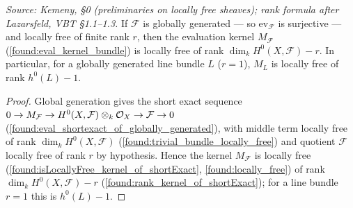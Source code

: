 \begin{lemma}
  \label{found:eval_kernel_locally_free}
  \textit{Source: Kemeny, \S0 (preliminaries on locally free sheaves); rank formula after Lazarsfeld, VBT \S1.1--1.3.}
  If \(\mathcal F\) is globally generated --- so \(\mathrm{ev}_{\mathcal F}\) is
  surjective --- and locally free of finite rank \(r\), then the evaluation kernel
  \(M_{\mathcal F}\) (\cref{found:eval_kernel_bundle}) is locally free of rank
  \(\dim_k H^0(X,\mathcal F)-r\).  In particular, for a globally generated line bundle
  \(L\) (\(r=1\)), \(M_L\) is locally free of rank \(h^0(L)-1\).
\end{lemma}

\begin{proof}
  Global generation gives the short exact sequence
  \(0\to M_{\mathcal F}\to H^0(X,\mathcal F)\otimes_k\mathcal{O}_X\to\mathcal F\to 0\)
  (\cref{found:eval_shortexact_of_globally_generated}), with middle term locally free
  of rank \(\dim_k H^0(X,\mathcal F)\) (\cref{found:trivial_bundle_locally_free}) and
  quotient \(\mathcal F\) locally free of rank \(r\) by hypothesis.  Hence the kernel
  \(M_{\mathcal F}\) is locally free (\cref{found:isLocallyFree_kernel_of_shortExact},
  \cref{found:locally_free}) of rank
  \(\dim_k H^0(X,\mathcal F)-r\) (\cref{found:rank_kernel_of_shortExact}); for a line
  bundle \(r=1\) this is \(h^0(L)-1\).
\end{proof}

